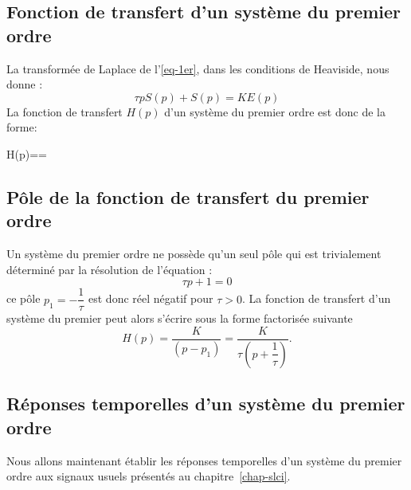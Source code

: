 \subsection{Fonction de transfert d'un système du premier ordre}
La transformée de Laplace de l'\cref{eq-1er}, dans les conditions de 
Heaviside, nous donne :
$$
\tau pS(p)+S(p)=KE(p)
$$
La fonction de transfert $H(p)$ d'un système du premier ordre est 
donc de la forme:
\begin{bequation}
    H(p)==\label{eq-ft1er}
\end{bequation}

\subsection{Pôle de la fonction de transfert du premier ordre}
Un système du premier ordre ne possède qu'un seul pôle qui est trivialement 
déterminé par la résolution de l'équation :
$$
\tau p + 1 =0
$$
ce pôle $p_1=-\dfrac{1}{\tau}$ est donc réel négatif pour $\tau>0$.
La fonction de transfert d'un système du premier peut alors s'écrire 
sous la forme factorisée suivante
$$
H(p)=\dfrac{K}{(p-p_1)}=\dfrac{K}{\tau\left(p+\dfrac{1}{\tau}\right)}.
$$

\subsection{Réponses temporelles d'un système du premier ordre}
Nous allons maintenant établir les réponses temporelles d'un système 
du premier ordre aux signaux usuels présentés au chapitre~\cref{chap-slci}.

